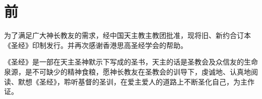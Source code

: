 \chapter*{前}

为了满足广大神长教友的需求，经中国天主教主教团批准，现将旧、新约合订本《圣经》印制发行。并再次感谢香港思高圣经学会的帮助。

《圣经》是一部在天主圣神默示下写成的圣书，天主的话是圣教会及众信友的生命泉源，是不可缺少的精神食粮，愿神长教友在圣教会的训导下，虔诚地、认真地阅读、默想《圣经》，聆听基督的圣训，在爱主爱人的道路上不断圣化自己，为主作证。


